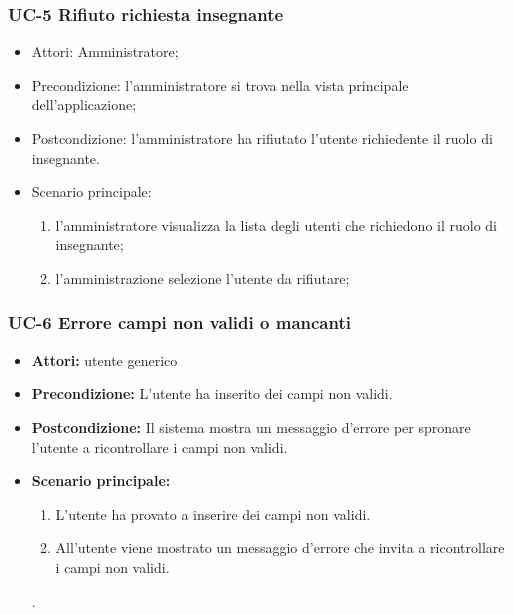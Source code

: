 	\subsubsection{UC-5 Rifiuto richiesta insegnante}
		\begin{itemize}
			\item Attori: Amministratore;
			\item Precondizione: l'amministratore si trova nella vista principale dell'applicazione;
			\item Postcondizione: l'amministratore ha rifiutato l'utente richiedente il ruolo di insegnante.
			\item Scenario principale:
				\begin{enumerate}
					\item l'amministratore visualizza la lista degli utenti che richiedono il ruolo di insegnante;
					\item l'amministrazione selezione l'utente da rifiutare;
				\end{enumerate}
		\end{itemize}

\subsubsection{UC-6 Errore campi non validi o mancanti}
\begin{itemize}
\item \textbf{Attori: } utente generico
\item \textbf{Precondizione: }L'utente ha inserito dei campi non validi.
\item \textbf{Postcondizione: }Il sistema mostra un messaggio d'errore per spronare l'utente a ricontrollare i campi non validi.
\item \textbf{Scenario principale: }
		\begin{enumerate}
		\item L'utente ha provato a inserire dei campi non validi.
		\item All'utente viene mostrato un messaggio d'errore che invita a ricontrollare i campi non validi.
		\end{enumerate}.
\end{itemize}

